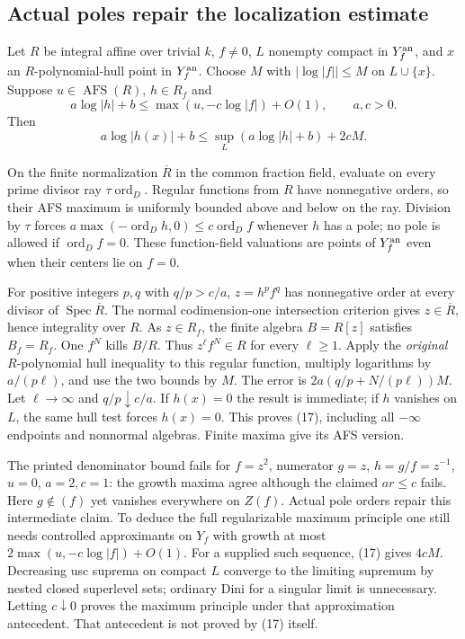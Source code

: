 \documentclass[
  11pt,
]{article}
\begin{document}
\subsection{Actual poles repair the localization
estimate}\label{actual-poles-repair-the-localization-estimate}

Let \(R\) be integral affine over trivial \(k\), \(f\ne0\), \(L\)
nonempty compact in \(Y_f^{\rm an}\), and \(x\) an \(R\)-polynomial-hull
point in \(Y_f^{\rm an}\). Choose \(M\) with \(|\log|f||\le M\) on
\(L\cup\{x\}\). Suppose \(u\in\operatorname{AFS}(R)\), \(h\in R_f\) and
\[a\log|h|+b\le\max(u,-c\log|f|)+O(1),\qquad a,c>0.\] Then
\[a\log|h(x)|+b\le\sup_L(a\log|h|+b)+2cM.                              \tag{17}\]

On the finite normalization \(\overline R\) in the common fraction
field, evaluate on every prime divisor ray \(\tau\operatorname{ord}_D\).
Regular functions from \(R\) have nonnegative orders, so their AFS
maximum is uniformly bounded above and below on the ray. Division by
\(\tau\) forces
\(a\max(-\operatorname{ord}_D h,0)\le c\operatorname{ord}_D f\) whenever
\(h\) has a pole; no pole is allowed if \(\operatorname{ord}_D f=0\).
These function-field valuations are points of \(Y_f^{\rm an}\) even when
their centers lie on \(f=0\).

For positive integers \(p,q\) with \(q/p>c/a\), \(z=h^pf^q\) has
nonnegative order at every divisor of
\(\operatorname{Spec}\overline R\). The normal codimension-one
intersection criterion gives \(z\in\overline R\), hence integrality over
\(R\). As \(z\in R_f\), the finite algebra \(B=R[z]\) satisfies
\(B_f=R_f\). One \(f^N\) kills \(B/R\). Thus \(z^\ell f^N\in R\) for
every \(\ell\ge1\). Apply the \emph{original} \(R\)-polynomial hull
inequality to this regular function, multiply logarithms by
\(a/(p\ell)\), and use the two bounds by \(M\). The error is
\(2a(q/p+N/(p\ell))M\). Let \(\ell\to\infty\) and \(q/p\downarrow c/a\).
If \(h(x)=0\) the result is immediate; if \(h\) vanishes on \(L\), the
same hull test forces \(h(x)=0\). This proves (17), including all
\(-\infty\) endpoints and nonnormal algebras. Finite maxima give its AFS
version.

The printed denominator bound fails for \(f=z^2\), numerator \(g=z\),
\(h=g/f=z^{-1}\), \(u=0\), \(a=2,c=1\): the growth maxima agree although
the claimed \(ar\le c\) fails. Here \(g\notin(f)\) yet vanishes
everywhere on \(Z(f)\). Actual pole orders repair this intermediate
claim. To deduce the full regularizable maximum principle one still
needs controlled approximants on \(Y_f\) with growth at most
\(2\max(u,-c\log|f|)+O(1)\). For a supplied such sequence, (17) gives
\(4cM\). Decreasing usc suprema on compact \(L\) converge to the
limiting supremum by nested closed superlevel sets; ordinary Dini for a
singular limit is unnecessary. Letting \(c\downarrow0\) proves the
maximum principle under that approximation antecedent. That antecedent
is not proved by (17) itself.
\end{document}
